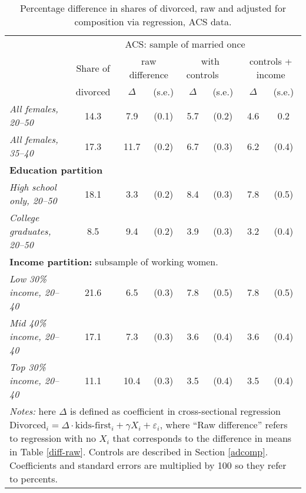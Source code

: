 \documentclass[12pt,letter]{article}
\begin{document}
\begin{table}
\begin{center}
\begin{tabular}{l c  c c c c c c}\cline{2-8}
\multicolumn{1}{c}{} & \multicolumn{7}{c}{ACS: sample of married once}\\\cline{2-8}
\multicolumn{1}{c}{} & \small Share of &\multicolumn{2}{c}{\small raw difference} & \multicolumn{2}{c}{\small with controls \,\,\, \,\,\,} & \multicolumn{2}{c}{\small controls + income} \\ \cline{3-8}
\multicolumn{1}{c}{} & \small divorced & $\Delta$ & (s.e.) & $\Delta$ & (s.e.) & $\Delta$ & (s.e.) \\\hline\hline
\textit{All females, 20--50} & 14.3 &  \phantom{0}7.9 &   (0.1) &    5.7  &    (0.2) &     4.6   &   0.2 \\
\textit{All females, 35--40} &  17.3 &  11.7  &  (0.2) &   6.7 &  (0.3) &     6.2  &   (0.4) \\\hline\hline
\multicolumn{8}{p{0.6\linewidth}}{\textbf{Education partition}}\\\hline
\textit{High school only, 20--50} & 18.1 &   \phantom{0}3.3  &    (0.2) &   8.4 &   (0.3)   &  7.8   &  (0.5) \\
\textit{College graduates, 20--50} & \phantom{0}8.5 &   \phantom{0}9.4 &   (0.2) &   3.9 &   (0.3) &   3.2   &  (0.4) \\\hline\hline
\multicolumn{8}{p{0.6\linewidth}}{\textbf{Income partition:} subsample of working women.}\\\hline
\textit{Low 30\% income, 20--40} &  21.6 &  \phantom{0}6.5 &    (0.3) &    7.8 &  (0.5) &   7.8   &  (0.5) \\
\textit{Mid 40\% income, 20--40} &  17.1 &  \phantom{0}7.3 &   (0.3) &    3.6   & (0.4) &   3.6 &    (0.4) \\
\textit{Top 30\% income, 20--40} & 11.1 &  10.4 &  (0.3) &    3.5 &   (0.4) & 3.5 &  (0.4) \\
\hline
\multicolumn{8}{p{0.9\linewidth}}{ \footnotesize \textit{Notes:} here $\Delta$ is defined as coefficient in cross-sectional regression
$\text{Divorced}_i = \Delta \cdot \text{kids-first}_i + \gamma X_i + \varepsilon_i$,
where ``Raw difference'' refers to regression with no $X_i$ that corresponds to the difference in means in Table \ref{diff-raw}. Controls are described in Section \ref{adcomp}. Coefficients and standard errors are multiplied by 100 so they refer to percents.}\\\hline
\end{tabular}
\caption{Percentage difference in shares of divorced, raw and adjusted for composition via regression, ACS data.\label{diff-contr}}
\end{center}
\end{table}
\end{document}

